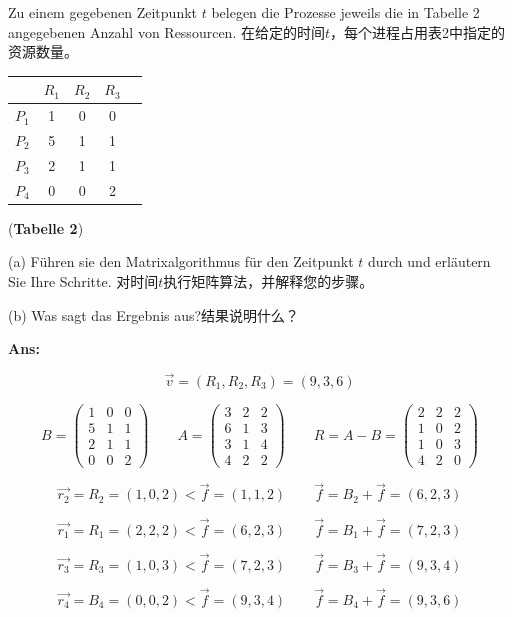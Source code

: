 \documentclass[fleqn]{article}
\begin{document}
Zu einem gegebenen Zeitpunkt $t$ belegen die Prozesse jeweils die in Tabelle 2 angegebenen Anzahl von Ressourcen.
在给定的时间$ t $，每个进程占用表2中指定的资源数量。

\begin{center}
    \begin{tabular}{c|cccc}
        &$R_1$&$R_2$&$R_3$&\\
        \hline
        $P_1$&1&0&0\\
        $P_2$&5&1&1\\
        $P_3$&2&1&1\\
        $P_4$&0&0&2\\
    \end{tabular}\qquad (\textbf{Tabelle 2})
\end{center}

(a) Führen sie den Matrixalgorithmus für den Zeitpunkt $t$ durch und erläutern Sie Ihre Schritte.
对时间$ t $执行矩阵算法，并解释您的步骤。

(b) Was sagt das Ergebnis aus?结果说明什么？

\textbf{Ans:}

$$\vec{v} = (R_1,R_2,R_3) = (9,3,6)$$

$$B=\begin{pmatrix}
   1&0&0\\
   5&1&1\\
   2&1&1\\
   0&0&2 
\end{pmatrix}\qquad A=\begin{pmatrix}
    3&2&2\\
    6&1&3\\
    3&1&4\\
    4&2&2
\end{pmatrix}\qquad R=A-B = \begin{pmatrix}
    2&2&2\\
    1&0&2\\
    1&0&3\\
    4&2&0
\end{pmatrix}$$

$$\vec{r_2}=R_2=(1,0,2)<\vec{f}=(1,1,2)\qquad \vec{f} = B_2 + \vec{f} = (6,2,3)$$

$$\vec{r_1}=R_1=(2,2,2)<\vec{f}=(6,2,3)\qquad \vec{f} = B_1 + \vec{f} = (7,2,3)$$

$$\vec{r_3}=R_3=(1,0,3)<\vec{f}=(7,2,3)\qquad \vec{f} = B_3 + \vec{f} = (9,3,4)$$

$$\vec{r_4}= B_4 = (0,0,2) <\vec{f}=(9,3,4)\qquad \vec{f}=B_4+\vec{f} = (9,3,6)$$
\end{document}
